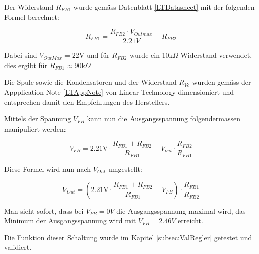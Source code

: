Der Widerstand $R_{FB1}$ wurde gemäss Datenblatt \ref{LTDatasheet}  mit der folgenden Formel berechnet:

\[
R_{FB1}=\frac{R_{FB2}\cdot V_{Outmax}}{2.21V}-R_{FB2}
\]

Dabei sind $V_{OutMax} =22$V und für $R_{FB2}$ wurde ein 10k$\Omega$ Widerstand verwendet, dies ergibt für $R_{FB1} \approx 90$k$\Omega$

Die Spule sowie die Kondensatoren und der Widerstand $R_{Vc}$ wurden gemäss der Appplication Note \ref{LTAppNote}  von Linear Technology dimensioniert und entsprechen damit den Empfehlungen des Herstellers.

Mittels der Spannung $V_{FB}$ kann nun die Ausgangsspannung folgendermassen manipuliert werden:

\[
V_{FB}=2.21\text{V}\cdot\frac{R_{FB1}+R_{FB2}}{R_{FB1}}-V_{out}\cdot\frac{R_{FB2}}{R_{FB1}}
\]

Diese Formel wird nun nach $V_{Out}$ umgestellt:

\[
V_{Out} = \left(2.21\text{V}\cdot\frac{R_{FB1}+R_{FB2}}{R_{FB1}} - V_{FB}\right) \cdot\frac{R_{FB1}}{R_{FB2}}
\]

Man sieht sofort, dass bei $V_{FB}=0V$ die Ausgangsspannung maximal wird, das Minimum der Ausgangsspannung wird mit $V_{FB}=2.46V$  erreicht.

Die Funktion dieser Schaltung wurde im Kapitel \ref{subsec:ValRegler} getestet und validiert.

%